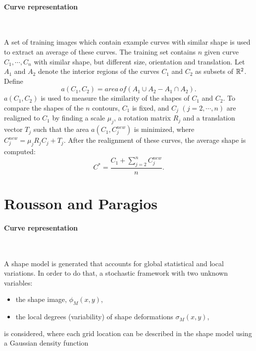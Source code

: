 \paragraph{Curve representation}
~\par \vspace{0.3cm}
A set of training images which contain example curves with similar shape is used to extract an average of these curves. The training set contains $n$ given curve $C_1, \cdots, C_n$ with similar shape, but different size, orientation and translation. Let $A_1$ and $A_2$ denote the interior regions of the curves $C_1$ and $C_2$ as subsets of $\mathbb{R}^2$. Define
\begin{equation}
  \label{eq:a-chen}
  a(C_1, C_2) = area \, of (A_1 \cup A_2 - A_1 \cap A_2).
\end{equation}
$a(C_1, C_2)$ is used to measure the similarity of the shapes of $C_1$ and $C_2$. To compare the shapes of the $n$ contours, $C_1$ is fixed, and $C_j$ $(j=2, \cdots, n)$ are realigned to $C_1$ by finding a scale $\mu_j$, a rotation matrix $R_j$ and a translation vector $T_j$ such that the area $a(C_1, C_j^{new})$ is minimized, where $C_j^{new} = \mu_j R_j C_j + T_j$. After the realignment of these curves, the average shape is computed:
\begin{equation}
  \label{eq:C*-chen}
  C^* = \frac{C_1 + \sum_{j=2}^n {C_j^{new}}} {n}.
\end{equation}



\newpage
\section[Rousson and Paragios]{Rousson and Paragios \cite{Rousson2002}}
\label{sec:shape-rousson}

\paragraph{Curve representation}
~\par \vspace{0.3cm}

A shape model is generated that accounts for global statistical and local variations. In order to do that, a stochastic framework with two unknown variables:
\begin{itemize}
 \item the shape image, $\phi_M (x, y)$,
 \item the local degrees (variability) of shape deformations $\sigma_M (x,y)$,
\end{itemize}
is considered, where each grid location can be described in the shape model using a Gaussian density function

